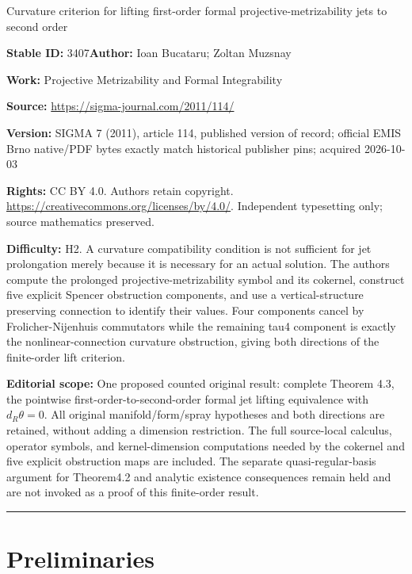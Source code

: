 \documentclass[11pt]{article}
\numberwithin{equation}{section}
\begin{document}
\begin{center}\Large Curvature criterion for lifting first-order formal projective-metrizability jets to second order\end{center}
\noindent\textbf{Stable ID:} 3407\quad\textbf{Author:} Ioan Bucataru; Zoltan Muzsnay\par
\noindent\textbf{Work:} Projective Metrizability and Formal Integrability\par
\noindent\textbf{Source:} \url{https://sigma-journal.com/2011/114/}\par
\noindent\textbf{Version:} SIGMA 7 (2011), article 114, published version of record; official EMIS Brno native/PDF bytes exactly match historical publisher pins; acquired 2026-10-03\par
\noindent\textbf{Rights:} CC BY 4.0. Authors retain copyright. \url{https://creativecommons.org/licenses/by/4.0/}. Independent typesetting only; source mathematics preserved.\par
\noindent\textbf{Difficulty:} H2. A curvature compatibility condition is not sufficient for jet prolongation merely because it is necessary for an actual solution. The authors compute the prolonged projective-metrizability symbol and its cokernel, construct five explicit Spencer obstruction components, and use a vertical-structure preserving connection to identify their values. Four components cancel by Frolicher-Nijenhuis commutators while the remaining tau4 component is exactly the nonlinear-connection curvature obstruction, giving both directions of the finite-order lift criterion.\par
\medskip\noindent\textbf{Editorial scope:} One proposed counted original result: complete Theorem 4.3, the pointwise first-order-to-second-order formal jet lifting equivalence with $d_R\theta=0$. All original manifold/form/spray hypotheses and both directions are retained, without adding a dimension restriction. The full source-local calculus, operator symbols, and kernel-dimension computations needed by the cokernel and five explicit obstruction maps are included. The separate quasi-regular-basis argument for Theorem4.2 and analytic existence consequences remain held and are not invoked as a proof of this finite-order result.\par
\medskip\hrule\medskip
\setcounter{section}{1}
\section{Preliminaries} \label{sec:prelim}
\end{document}
